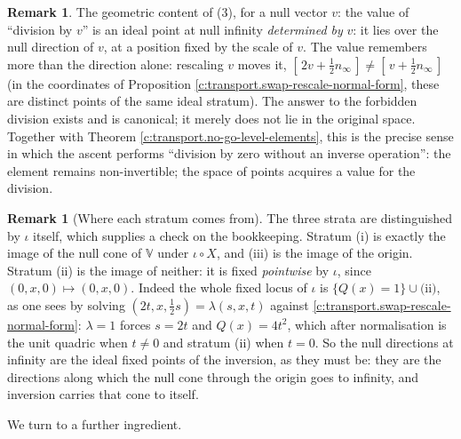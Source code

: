 \documentclass[11pt]{article}
\theoremstyle{definition}
\newtheorem{remark}[theorem]{Remark}
\theoremstyle{plain}
\providecommand{\nInf}{}\renewcommand{\nInf}{n_\infty}
\begin{document}
\begin{remark}\label{c:note.transport.destination}
The geometric content of (3), for a null vector $v$: the value of ``division by $v$'' is an ideal point at null infinity \emph{determined by} $v$: it lies over the null direction of $v$, at a position fixed by the scale of $v$. The value remembers more than the direction alone: rescaling $v$ moves it, $[\,2v + \tfrac12\nInf\,] \neq [\,v + \tfrac12\nInf\,]$ (in the coordinates of Proposition \ref{c:transport.swap-rescale-normal-form}, these are distinct points of the same ideal stratum). The answer to the forbidden division exists and is canonical; it merely does not lie in the original space. Together with Theorem \ref{c:transport.no-go-level-elements}, this is the precise sense in which the ascent performs ``division by zero without an inverse operation'': the element remains non-invertible; the space of points acquires a value for the division.
\end{remark}

\begin{remark}[Where each stratum comes from]\label{c:note.transport.where-each-stratum-comes}
The three strata are distinguished by $\iota$ itself, which supplies a check on the bookkeeping. Stratum (i) is exactly the image of the null cone of $\mathbb{V}$ under $\iota \circ X$, and (iii) is the image of the origin. Stratum (ii) is the image of neither: it is fixed \emph{pointwise} by $\iota$, since $(0,x,0) \mapsto (0,x,0)$. Indeed the whole fixed locus of $\iota$ is $\{Q(x) = 1\} \cup \text{(ii)}$, as one sees by solving $(2t, x, \tfrac12 s) = \lambda(s,x,t)$ against \ref{c:transport.swap-rescale-normal-form}: $\lambda = 1$ forces $s = 2t$ and $Q(x) = 4t^2$, which after normalisation is the unit quadric when $t \neq 0$ and stratum (ii) when $t = 0$. So the null directions at infinity are the ideal fixed points of the inversion, as they must be: they are the directions along which the null cone through the origin goes to infinity, and inversion carries that cone to itself.
\end{remark}

We turn to a further ingredient.
\end{document}

